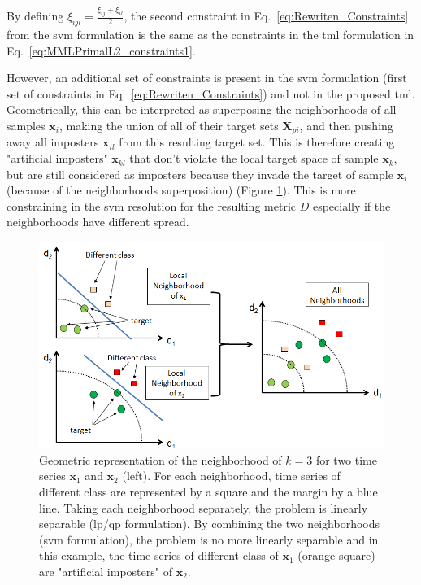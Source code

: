 \noindent By defining $\xi_{ijl}=\frac{\xi_{ij}+\xi_{il}}{2}$, the second constraint in Eq.~\ref{eq:Rewriten_Constraints} from the {\sc svm} formulation is the same as the constraints in the {\sc tml} formulation in Eq.~\ref{eq:MMLPrimalL2_constraints1}. 

\indent However, an additional set of constraints is present in the {\sc svm} formulation (first set of constraints in Eq.~\ref{eq:Rewriten_Constraints}) and not in the proposed {\sc tml}. Geometrically, this can be interpreted as superposing the neighborhoods of all samples $\textbf{x}_i$, making the union of all of their target sets $\textbf{X}_{pi}$, and then pushing away all imposters $\textbf{x}_{il}$ from this resulting target set. This is therefore creating "artificial imposters" $\textbf{x}_{kl}$ that don't violate the local target space of sample $\textbf{x}_k$, but are still considered as imposters because they invade the target of sample $\textbf{x}_i$ (because of the neighborhoods superposition) (Figure \ref{fig:Neighborhood_scaling_problem}). This is more constraining in the {\sc svm} resolution for the resulting metric $D$ especially if the neighborhoods have different spread. 

\begin{figure}[h!]
	\centering
	\includegraphics[width=0.9\linewidth]{images/Neighborhood_scaling_problem}
	\caption{Geometric representation of the neighborhood of $k=3$ for two time series $\textbf{x}_1$ and $\textbf{x}_2$ (left). For each neighborhood, time series of different class are represented by a square and the margin by a blue line. Taking each neighborhood separately, the problem is linearly separable ({\sc lp}/{\sc qp} formulation). By combining the two neighborhoods ({\sc svm} formulation), the problem is no more linearly separable and in this example, the time series of different class of $\textbf{x}_1$ (orange square) are "artificial imposters" of $\textbf{x}_2$. }
	\label{fig:Neighborhood_scaling_problem}
\end{figure}


